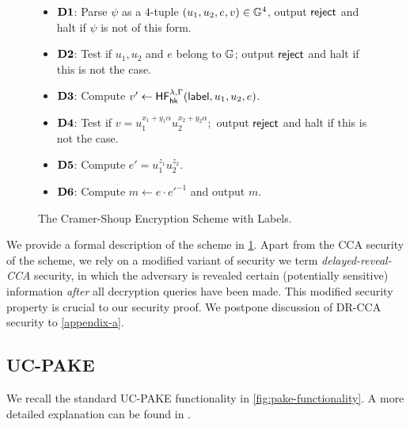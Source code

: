 \begin{figure}[tbp]
\begin{framed}
		\begin{itemize}
			\itemsep=0em
			\item[]\textbf{$\mathbf{D1}$}: Parse $\psi$ as a $4$-tuple $(u_1,u_2,e,v)\in\mathbb{G}^4$, output $\mathsf{reject}$ and halt if $\psi$ is not of this form.
			\item[]\textbf{$\mathbf{D2}$}: Test if $u_1, u_2$ and $e$ belong to $\mathbb{G}$; output $\mathsf{reject}$ and halt if this is not the case.
			\item[]\textbf{$\mathbf{D3}$}: Compute $v'\gets\mathsf{HF}^{\lambda,\Gamma}_{\mathsf{hk}}(\mathsf{label},u_1,u_2,e)$.
			\item[]\textbf{$\mathbf{D4}$}: Test if $v = u_1^{x_1+y_1\alpha}u_2^{x_2+y_2\alpha};$ output $\mathsf{reject}$ and halt if this is not the case.
			\item[]\textbf{$\mathbf{D5}$}: Compute $e' = u_1^{z_1}u_2^{z_2}$.
			\item[]\textbf{$\mathbf{D6}$}: Compute $m\gets e\cdot {e'}^{-1}$ and output $m$.
		\end{itemize}
	\end{framed}
	\caption{The Cramer-Shoup Encryption Scheme with Labels.}
	\label{fig:cs03}
	\end{figure}

We provide a formal description of the scheme in \cref{fig:cs03}. Apart from the CCA security of the scheme, we rely on a modified variant of security we term \textit{delayed-reveal-CCA} security, in which the adversary is revealed certain (potentially sensitive) information \textit{after} all decryption queries have been made. This modified security property is crucial to our security proof. We postpone discussion of DR-CCA security to \cref{appendix-a}.

\subsection{UC-PAKE}
	
	We recall the standard UC-PAKE functionality \cite{EC:CHKLM05} in \cref{fig:pake-functionality}. A more detailed explanation can be found in \cite{PKC:RoyXu23}.
	
